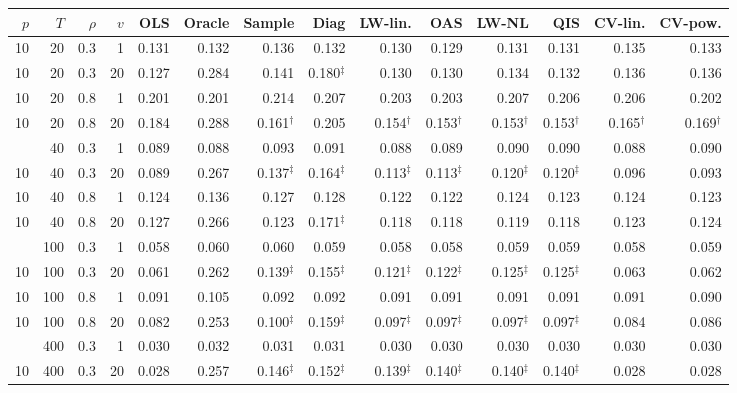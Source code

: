 \begin{tabular}{@{}rrrrrrrrrrrrrr@{}}
\toprule
$p$ & $T$ & $\rho$ & $v$ & OLS & Oracle & Sample & Diag & LW-lin. & OAS & LW-NL & QIS & CV-lin. & CV-pow. \\
\midrule
10 & 20 & 0.3 & 1 & 0.131 & 0.132 & 0.136 & 0.132 & 0.130 & 0.129 & 0.131 & 0.131 & 0.135 & 0.133 \\
10 & 20 & 0.3 & 20 & 0.127 & 0.284 & 0.141 & 0.180$^{\ddagger}$ & 0.130 & 0.130 & 0.134 & 0.132 & 0.136 & 0.136 \\
10 & 20 & 0.8 & 1 & 0.201 & 0.201 & 0.214 & 0.207 & 0.203 & 0.203 & 0.207 & 0.206 & 0.206 & 0.202 \\
10 & 20 & 0.8 & 20 & 0.184 & 0.288 & 0.161$^{\dagger}$ & 0.205 & 0.154$^{\dagger}$ & 0.153$^{\dagger}$ & 0.153$^{\dagger}$ & 0.153$^{\dagger}$ & 0.165$^{\dagger}$ & 0.169$^{\dagger}$ \\
\addlinespace[1pt]
10 & 40 & 0.3 & 1 & 0.089 & 0.088 & 0.093 & 0.091 & 0.088 & 0.089 & 0.090 & 0.090 & 0.088 & 0.090 \\
10 & 40 & 0.3 & 20 & 0.089 & 0.267 & 0.137$^{\ddagger}$ & 0.164$^{\ddagger}$ & 0.113$^{\ddagger}$ & 0.113$^{\ddagger}$ & 0.120$^{\ddagger}$ & 0.120$^{\ddagger}$ & 0.096 & 0.093 \\
10 & 40 & 0.8 & 1 & 0.124 & 0.136 & 0.127 & 0.128 & 0.122 & 0.122 & 0.124 & 0.123 & 0.124 & 0.123 \\
10 & 40 & 0.8 & 20 & 0.127 & 0.266 & 0.123 & 0.171$^{\ddagger}$ & 0.118 & 0.118 & 0.119 & 0.118 & 0.123 & 0.124 \\
\addlinespace[1pt]
10 & 100 & 0.3 & 1 & 0.058 & 0.060 & 0.060 & 0.059 & 0.058 & 0.058 & 0.059 & 0.059 & 0.058 & 0.059 \\
10 & 100 & 0.3 & 20 & 0.061 & 0.262 & 0.139$^{\ddagger}$ & 0.155$^{\ddagger}$ & 0.121$^{\ddagger}$ & 0.122$^{\ddagger}$ & 0.125$^{\ddagger}$ & 0.125$^{\ddagger}$ & 0.063 & 0.062 \\
10 & 100 & 0.8 & 1 & 0.091 & 0.105 & 0.092 & 0.092 & 0.091 & 0.091 & 0.091 & 0.091 & 0.091 & 0.090 \\
10 & 100 & 0.8 & 20 & 0.082 & 0.253 & 0.100$^{\ddagger}$ & 0.159$^{\ddagger}$ & 0.097$^{\ddagger}$ & 0.097$^{\ddagger}$ & 0.097$^{\ddagger}$ & 0.097$^{\ddagger}$ & 0.084 & 0.086 \\
\addlinespace[1pt]
10 & 400 & 0.3 & 1 & 0.030 & 0.032 & 0.031 & 0.031 & 0.030 & 0.030 & 0.030 & 0.030 & 0.030 & 0.030 \\
10 & 400 & 0.3 & 20 & 0.028 & 0.257 & 0.146$^{\ddagger}$ & 0.152$^{\ddagger}$ & 0.139$^{\ddagger}$ & 0.140$^{\ddagger}$ & 0.140$^{\ddagger}$ & 0.140$^{\ddagger}$ & 0.028 & 0.028 \\

\end{tabular}
